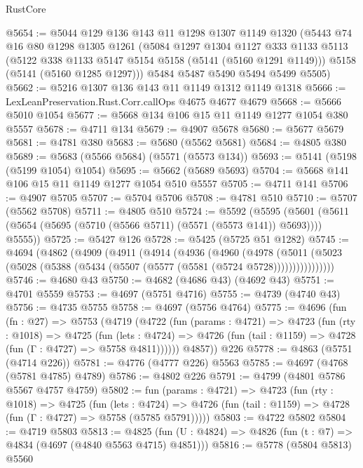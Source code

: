 \begin{lexlean}{RustCore}
\begin{coremodule}
@5654 := @5044
    @129
    @136
    @143
    @11
    @1298
    @1307
    @1149
    @1320
    (@5443
      @74
      @16
      @80
      @1298
      @1305
      @1261
      (@5084
        @1297
        @1304
        @1127
        @333
        @1133
        @5113
        (@5122 @338 @1133 @5147 @5154 @5158 (@5141 (@5160 @1291 @1149)))
        @5158
        (@5141 (@5160 @1285 @1297)))
      @5484
      @5487
      @5490
      @5494
      @5499
      @5505)
@5662 := @5216 @1307 @136 @143 @11 @1149 @1312 @1149 @1318
@5666 := LexLeanPreservation.Rust.Corr.callOps @4675 @4677 @4679
@5668 := @5666 @5010 @1054
@5677 := @5668 @134 @106 @15 @11 @1149 @1277 @1054 @380 @5557
@5678 := @4711 @134
@5679 := @4907 @5678
@5680 := @5677 @5679
@5681 := @4781 @380
@5683 := @5680 (@5562 @5681)
@5684 := @4805 @380
@5689 := @5683 (@5566 @5684) (@5571 (@5573 @134))
@5693 := @5141 (@5198 (@5199 @1054) @1054)
@5695 := @5662 (@5689 @5693)
@5704 := @5668 @141 @106 @15 @11 @1149 @1277 @1054 @510 @5557
@5705 := @4711 @141
@5706 := @4907 @5705
@5707 := @5704 @5706
@5708 := @4781 @510
@5710 := @5707 (@5562 @5708)
@5711 := @4805 @510
@5724 := @5592
    (@5595 (@5601 (@5611 (@5654 (@5695 (@5710 (@5566 @5711) (@5571 (@5573 @141)) @5693)))) @5555))
@5725 := @5427 @126
@5728 := @5425 (@5725 @51 @1282)
@5745 := @4694
    (@4862
      (@4909
        (@4911
          (@4914
            (@4936
              (@4960
                (@4978
                  (@5011
                    (@5023 (@5028 (@5388 (@5434 (@5507 (@5577 (@5581 (@5724 @5728))))))))))))))))
@5746 := @4680 @43
@5750 := @4682 (@4686 @43) (@4692 @43)
@5751 := @4701 @5559
@5753 := @4697 (@5751 @4716)
@5755 := @4739 (@4740 @43)
@5756 := @4735 @5755
@5758 := @4697 (@5756 @4764)
@5775 := @4696
    (fun (fn : @27) =>
    @5753
      (@4719
        (@4722
          (fun (params : @4721) =>
          @4723
            (fun (rty : @1018) =>
            @4725
              (fun (lets : @4724) =>
              @4726 (fun (tail : @1159) => @4728 (fun (Γ : @4727) => @5758 @4811))))))
        @4857))
    @226
@5778 := @4863 (@5751 (@4714 @226))
@5781 := @4776 (@4777 @226) @5563
@5785 := @4697 (@4768 (@5781 @4785) @4789)
@5786 := @4802 @226
@5791 := @4799 (@4801 @5786 @5567 @4757 @4759)
@5802 := fun (params : @4721) =>
  @4723
    (fun (rty : @1018) =>
    @4725
      (fun (lets : @4724) =>
      @4726 (fun (tail : @1159) => @4728 (fun (Γ : @4727) => @5758 (@5785 @5791)))))
@5803 := @4722 @5802
@5804 := @4719 @5803
@5813 := @4825 (fun (U : @4824) => @4826 (fun (t : @7) => @4834 (@4697 (@4840 @5563 @4715) @4851)))
@5816 := @5778 (@5804 @5813) @5560

\end{coremodule}
\end{lexlean}
